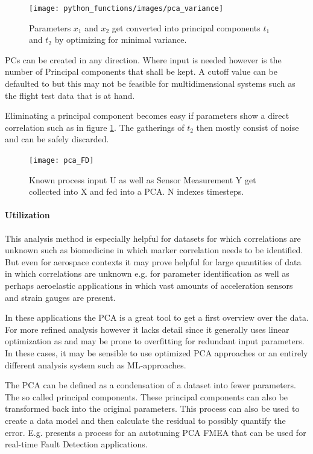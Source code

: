 \begin{figure}[h]
    \centering
    \texttt{[image: python\_functions/images/pca\_variance]}
    \caption{Parameters $x_1$ and $x_2$ get converted into principal components $t_1$ and $t_2$ by optimizing for minimal variance.}
    \label{fig:pca_variance}
\end{figure}

PCs can be created in any direction. Where input is needed however is the number of Principal components that shall be kept. A cutoff value can be defaulted to but this may not be feasible for multidimensional systems such as the flight test data that is at hand.


Eliminating a principal component becomes easy if parameters show a direct correlation such as in figure \ref{fig:pca_variance}. The gatherings of $t_2$ then mostly consist of noise and can be safely discarded.



\begin{figure}
    \centering
    \texttt{[image: pca\_FD]}

    \caption{Known process input U as well as Sensor Measurement Y get collected into X and fed into a PCA. N indexes timesteps.\cite[p.268]{isermann_fault-diagnosis_2006}}
    \label{fig:pca_FD}
\end{figure}

\paragraph{Utilization}

This analysis method is especially helpful for datasets for which correlations are unknown such as biomedicine in which marker correlation needs to be identified. But even for aerospace contexts it may prove helpful for large quantities of data in which correlations are unknown e.g. for parameter identification as well as perhaps aeroelastic applications in which vast amounts of acceleration sensors and strain gauges are present.

In these applications the PCA is a great tool to get a first overview over the data. For more refined analysis however it lacks detail since it generally uses linear optimization as and may be prone to overfitting for redundant input parameters. In these cases, it may be sensible to use optimized PCA approaches or an entirely different analysis system such as ML-approaches.

The PCA can be defined as a condensation of a dataset into fewer parameters. The so called principal components. These principal components can also be transformed back into the original parameters. This process can also be used to create a data model and then calculate the residual to possibly quantify the error. E.g. \textcite{isermann_fault-diagnosis_2006} presents a process for an autotuning PCA FMEA that can be used for real-time Fault Detection applications.

